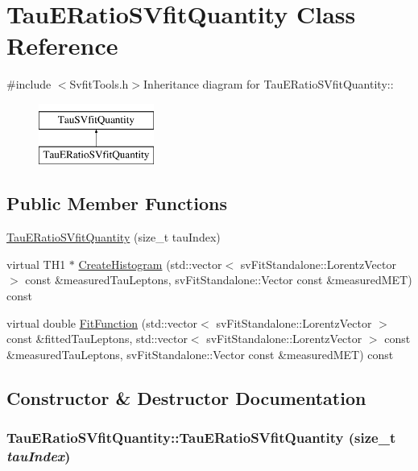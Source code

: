 \hypertarget{classTauERatioSVfitQuantity}{
\section{TauERatioSVfitQuantity Class Reference}
\label{classTauERatioSVfitQuantity}
}


{\ttfamily \#include $<$SvfitTools.h$>$}Inheritance diagram for TauERatioSVfitQuantity::\begin{figure}[H]
\begin{center}
\leavevmode
\includegraphics[height=2cm]{classTauERatioSVfitQuantity}
\end{center}
\end{figure}
\subsection*{Public Member Functions}
\begin{DoxyCompactItemize}
\item 
\hyperlink{classTauERatioSVfitQuantity_ad72202826b78cba466a8e3b443b83630}{TauERatioSVfitQuantity} (size\_\-t tauIndex)
\item 
virtual TH1 $\ast$ \hyperlink{classTauERatioSVfitQuantity_a5d010fd581144c6a95873899d7b8acec}{CreateHistogram} (std::vector$<$ svFitStandalone::LorentzVector $>$ const \&measuredTauLeptons, svFitStandalone::Vector const \&measuredMET) const 
\item 
virtual double \hyperlink{classTauERatioSVfitQuantity_a48e2918f090e27418f90f683a0f4c9db}{FitFunction} (std::vector$<$ svFitStandalone::LorentzVector $>$ const \&fittedTauLeptons, std::vector$<$ svFitStandalone::LorentzVector $>$ const \&measuredTauLeptons, svFitStandalone::Vector const \&measuredMET) const 
\end{DoxyCompactItemize}


\subsection{Constructor \& Destructor Documentation}
\hypertarget{classTauERatioSVfitQuantity_ad72202826b78cba466a8e3b443b83630}{
\subsubsection[{TauERatioSVfitQuantity}]{\setlength{\rightskip}{0pt plus 5cm}TauERatioSVfitQuantity::TauERatioSVfitQuantity (size\_\-t {\em tauIndex})}}
\label{classTauERatioSVfitQuantity_ad72202826b78cba466a8e3b443b83630}


